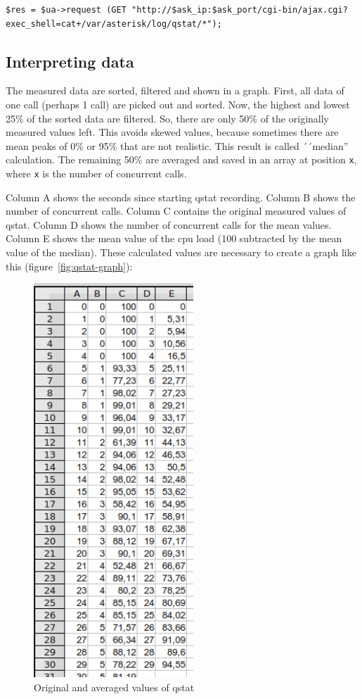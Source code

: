 \begin{lstlisting}[breaklines=true,label=code:qstat-download,caption={Downloading recorded cpu load data} ]
$res = $ua->request (GET "http://$ask_ip:$ask_port/cgi-bin/ajax.cgi?exec_shell=cat+/var/asterisk/log/qstat/*");
\end{lstlisting}

\subsection{Interpreting data}%

The measured data are sorted, filtered and shown in a graph.
First, all data of one call (perhaps 1 call) are picked out and sorted. Now, the highest and lowest 25\% of the sorted
data are filtered. So, there are only 50\% of the originally measured values left. This avoids skewed values, because
sometimes there are mean peaks of 0\% or 95\% that are not realistic. This result is called ´´median'' calculation.
The remaining 50\% are averaged and saved in an array at position \texttt{x}, where \texttt{x} is the number of concurrent
calls.

Column A shows the seconds since starting qstat recording. Column B shows the number of concurrent calls.
Column C contains the original measured values of qstat. Column D shows the number of concurrent calls
for the mean values. Column E shows the mean value of the cpu load (100 subtracted by the mean value of the median).
These calculated values are necessary to create a graph like this (figure~\ref{fig:qstat-graph}):

\begin{figure} [!ht]
\centering
\includegraphics [width=6cm] {qstat-3}
\caption{Original and averaged values of qstat}
\end{figure}

